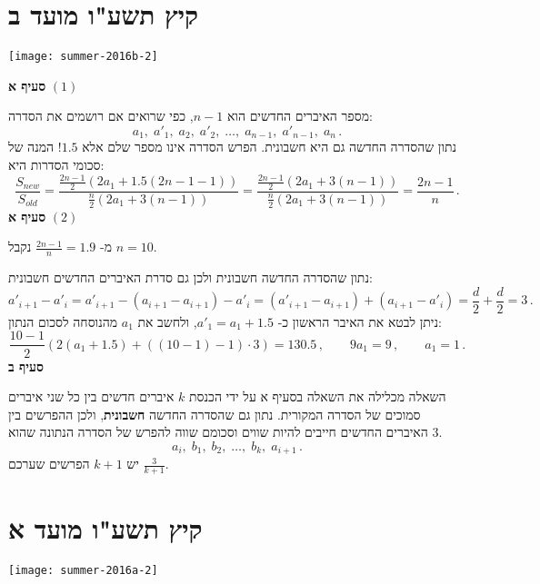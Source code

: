 
\np
\section{קיץ תשע"ו מועד ב}

\begin{center}
\texttt{[image: summer-2016b-2]}
\end{center}
\vspace{-1ex}

\textbf{סעיף א}
$(1)$

מספר האיברים החדשים הוא
$n-1$,
כפי שרואים אם רושמים את הסדרה:
\[
a_1,\; a'_1,\; a_2,\; a'_2,\; \ldots,\; a_{n-1},\; a'_{n-1},\; a_n\,.
\]
נתון שהסדרה החדשה גם היא חשבונית. הפרש הסדרה אינו מספר שלם אלא
$1.5$!
המנה של סכומי הסדרות היא:
\[
\frac{S_{\mathit{new}}}{S_{\mathit{old}}}= \frac{\displaystyle\frac{2n-1}{2}(2a_1+1.5(2n-1-1))}{\displaystyle\frac{n}{2}(2a_1+3(n-1))}=\frac{\displaystyle\frac{2n-1}{2}(2a_1+3(n-1))}{\displaystyle\frac{n}{2}(2a_1+3(n-1))}=\frac{2n-1}{n}\,.
\]
\textbf{סעיף א}
$(2)$

מ-%
$\displaystyle\frac{2n-1}{n}=1.9$
נקבל
$n=10$.

נתון שהסדרה החדשה חשבונית ולכן גם סדרת האיברים החדשים חשבונית:
\[
a'_{i+1}-a'_{i}=a'_{i+1}-(a_{i+1}-a_{i+1})-a'_i=(a'_{i+1}-a_{i+1})+(a_{i+1}-a'_i)=\frac{d}{2}+\frac{d}{2}=3\,.
\]
ניתן לבטא את האיבר הראשון כ-%
$a'_1=a_1+1.5$,
ולחשב את
$a_1$
מהנוסחה לסכום הנתון:
\[
\frac{10-1}{2}(2(a_1+1.5)+((10-1)-1)\cdot 3) = 130.5\,,\quad\quad 9a_1=9\,,\quad\quad a_1=1\,.
\]
\textbf{סעיף ב}

השאלה מכלילה את השאלה בסעיף א על ידי הכנסת
$k$
איברים חדשים בין כל שני איברים סמוכים של הסדרה המקורית. נתון גם שהסדרה החדשה
\textbf{חשבונית},
ולכן ההפרשים בין האיברים החדשים חייבים להיות שווים וסכומם שווה להפרש של הסדרה הנתונה שהוא
$3$.
\[
a_i,\; b_1,\; b_2,\; \ldots,\; b_k,\; a_{i+1}\,.
\]
יש
$k+1$
הפרשים שערכם
$\displaystyle\frac{3}{k+1}$.


\np
\section{קיץ תשע"ו מועד א}

\begin{center}
\texttt{[image: summer-2016a-2]}
\end{center}
\vspace{-2ex}

